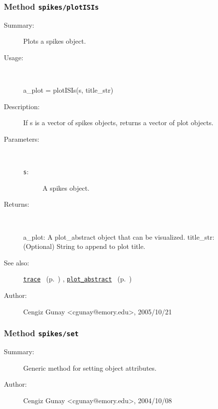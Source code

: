 \subsubsection[Method \texttt{plotISIs}]{Method \texttt{spikes/plotISIs}}%
%
\label{ref_spikes__plotISIs}%
\hypertarget{ref_spikes__plotISIs}{}%
\begin{description}
\item[Summary:]Plots a spikes object.
%
\item[Usage:]~%
\begin{lyxcode}%
a\_plot = plotISIs(s, title\_str)
%
\end{lyxcode}%
%
\item[Description:]%
If s is a vector of spikes objects, returns a vector of plot objects.
\item[Parameters:]~
\begin{description}%
\item[\texttt{s}:]
 A spikes object.
\end{description}%
%
\item[Returns:
]~

	a\_plot: A plot\_abstract object that can be visualized.
	title\_str: (Optional) String to append to plot title.
%
%
\item[See also:]%
\hyperlink{ref_trace}{\texttt{trace}}%
\ (p.~\pageref{ref_trace})%
%
, \hyperlink{ref_plot_abstract}{\texttt{plot\_abstract}}%
\ (p.~\pageref{ref_plot_abstract})%
%
%
\item[Author:]%
Cengiz Gunay <cgunay@emory.edu>, 2005/10/21
%
\end{description}
\methodline%
\subsubsection[Method \texttt{set}]{Method \texttt{spikes/set}}%
%
\label{ref_spikes__set}%
\hypertarget{ref_spikes__set}{}%
\begin{description}
\item[Summary:]Generic method for setting object attributes.
%
%
%
%
%
%
%
\item[Author:]%
Cengiz Gunay <cgunay@emory.edu>, 2004/10/08
%
\end{description}
\methodline%
